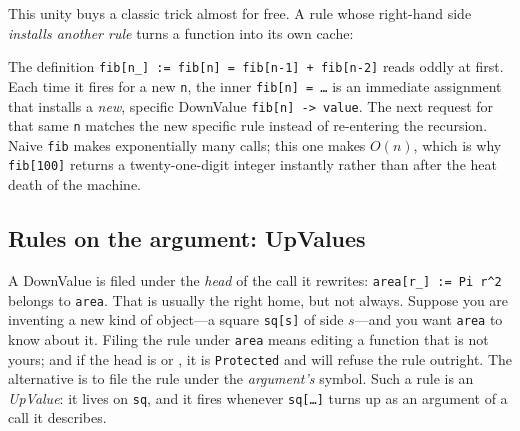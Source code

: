 This unity buys a classic trick almost for free. A rule whose right-hand side
\emph{installs another rule} turns a function into its own cache:


The definition \texttt{fib[n\_] := fib[n] = fib[n-1] + fib[n-2]} reads oddly at
first. Each time it fires for a new \texttt{n}, the inner \texttt{fib[n] = \ldots}
is an immediate assignment that installs a \emph{new}, specific DownValue
\texttt{fib[n] -> value}. The next request for that same \texttt{n} matches the
new specific rule instead of re-entering the recursion. Naive \texttt{fib} makes
exponentially many calls; this one makes \(O(n)\), which is why \texttt{fib[100]}
returns a twenty-one-digit integer instantly rather than after the heat death of
the machine.


\subsection{Rules on the argument: UpValues}
\label{ssec:prog-upvalues}

A DownValue is filed under the \emph{head} of the call it rewrites:
\texttt{area[r\_] := Pi r\^{}2} belongs to \texttt{area}. That is usually the right
home, but not always. Suppose you are inventing a new kind of object---a square
\texttt{sq[s]} of side \(s\)---and you want \texttt{area} to know about it. Filing
the rule under \texttt{area} means editing a function that is not yours; and if the
head is  or , it is \texttt{Protected} and will refuse the rule
outright. The alternative is to file the rule under the \emph{argument's} symbol.
Such a rule is an \emph{UpValue}: it lives on \texttt{sq}, and it
fires whenever \texttt{sq[\ldots]} turns up as an argument of a call it describes.

